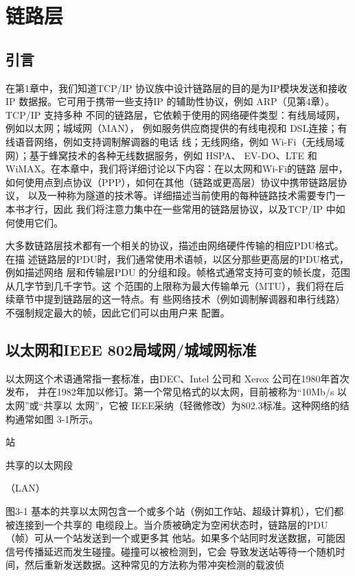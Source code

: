 \chapter{链路层}
\minitoc

\section{引言}

在第1章中，我们知道TCP/IP 协议族中设计链路层的目的是为IP模块发送和接收IP
数据报。它可用于携带一些支持IP 的辅助性协议，例如 ARP（见第4章）。TCP/IP 支持多种
不同的链路层，它依赖于使用的网络硬件类型：有线局域网，例如以太网；城域网（MAN），
例如服务供应商提供的有线电视和 DSL连接；有线语音网络，例如支持调制解调器的电话
线；无线网络，例如 Wi-Fi（无线局域网）；基于蜂窝技术的各种无线数据服务，例如 HSPA、
EV-DO、LTE 和 WiMAX。在本章中，我们将详细讨论以下内容：在以太网和Wi-Fi的链路
层中，如何使用点到点协议（PPP），如何在其他（链路或更高层）协议中携带链路层协议，
以及一种称为隧道的技术等。详细描述当前使用的每种链路技术需要专门一本书才行，因此
我们将注意力集中在一些常用的链路层协议，以及TCP/IP 中如何使用它们。

大多数链路层技术都有一个相关的协议，描述由网络硬件传输的相应PDU格式。在描
述链路层的PDU时，我们通常使用术语帧，以区分那些更高层的PDU格式，例如描述网络
层和传输层PDU 的分组和段。帧格式通常支持可变的帧长度，范围从几字节到几千字节。这
个范围的上限称为最大传输单元（MTU），我们将在后续章节中提到链路层的这一特点。有
些网络技术（例如调制解调器和串行线路）不强制规定最大的帧，因此它们可以由用户来
配置。

\section{以太网和IEEE 802局域网/城域网标准}

以太网这个术语通常指一套标准，由DEC、Intel 公司和 Xerox 公司在1980年首次发布，
并在1982年加以修订。第一个常见格式的以太网，目前被称为“10Mb/s 以太网”或“共享以
太网”，它被 IEEE采纳（轻微修改）为802.3标准。这种网络的结构通常如图 3-1所示。

站

共享的以太网段

（LAN）

图3-1 基本的共享以太网包含一个或多个站（例如工作站、超级计算机），它们都被连接到一个共享的
电缆段上。当介质被确定为空闲状态时，链路层的PDU（帧）可从一个站发送到一个或更多其
他站。如果多个站同时发送数据，可能因信号传播延迟而发生碰撞。碰撞可以被检测到，它会
导致发送站等待一个随机时间，然后重新发送数据。这种常见的方法称为带冲突检测的载波侦


